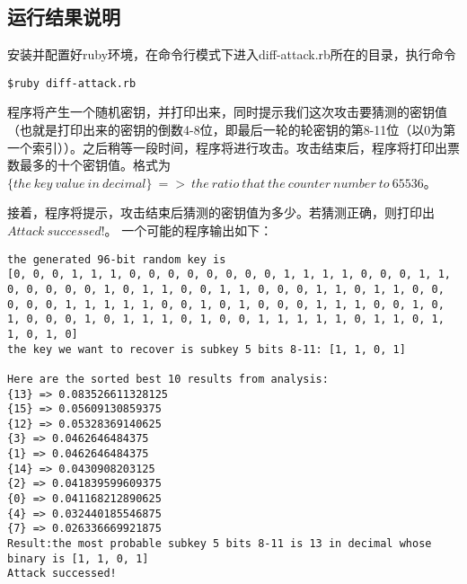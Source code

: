 \documentclass{article}
\begin{document}
\subsection*{运行结果说明}
安装并配置好ruby环境，在命令行模式下进入diff-attack.rb所在的目录，执行命令
\begin{lstlisting}[frame=shadowbox]
$ruby diff-attack.rb
\end{lstlisting}
程序将产生一个随机密钥，并打印出来，同时提示我们这次攻击要猜测的密钥值（也就是打印出来的密钥的倒数4-8位，即最后一轮的轮密钥的第8-11位（以0为第一个索引））。之后稍等一段时间，程序将进行攻击。攻击结束后，程序将打印出票数最多的十个密钥值。格式为$\{the\ key\ value\ in\ decimal\}\ =>\ the\ ratio\ that\ the\ counter\ number\ to\ 65536$。

接着，程序将提示，攻击结束后猜测的密钥值为多少。若猜测正确，则打印出$Attack\ successed!$。
一个可能的程序输出如下：
\begin{lstlisting}[title=result, frame=shadowbox]
the generated 96-bit random key is
[0, 0, 0, 1, 1, 1, 0, 0, 0, 0, 0, 0, 0, 0, 1, 1, 1, 1, 0, 0, 0, 1, 1, 0, 0, 0, 0, 0, 1, 0, 1, 1, 0, 0, 1, 1, 0, 0, 0, 1, 1, 0, 1, 1, 0, 0, 0, 0, 0, 1, 1, 1, 1, 1, 0, 0, 1, 0, 1, 0, 0, 0, 1, 1, 1, 0, 0, 1, 0, 1, 0, 0, 0, 1, 0, 1, 1, 1, 0, 1, 0, 0, 1, 1, 1, 1, 1, 0, 1, 1, 0, 1, 1, 0, 1, 0]
the key we want to recover is subkey 5 bits 8-11: [1, 1, 0, 1]

Here are the sorted best 10 results from analysis:
{13} => 0.083526611328125
{15} => 0.05609130859375
{12} => 0.05328369140625
{3} => 0.0462646484375
{1} => 0.0462646484375
{14} => 0.0430908203125
{2} => 0.041839599609375
{0} => 0.041168212890625
{4} => 0.032440185546875
{7} => 0.026336669921875
Result:the most probable subkey 5 bits 8-11 is 13 in decimal whose binary is [1, 1, 0, 1]
Attack successed!

\end{lstlisting}
\end{document}
